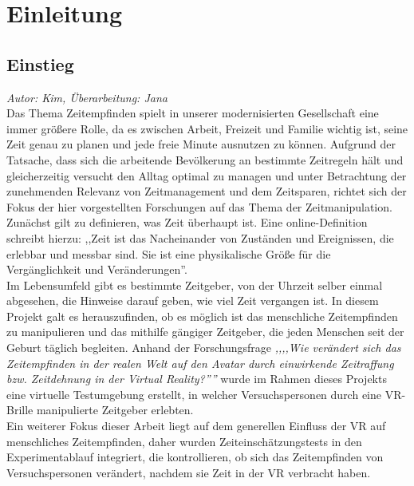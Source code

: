 \documentclass{Bericht}
\begin{document}
\maketitle


\tableofcontents
\clearpage

\section{Einleitung}
\subsection{Einstieg}
\textit{Autor: Kim, Überarbeitung: Jana}\\
	Das Thema Zeitempfinden spielt in unserer modernisierten Gesellschaft eine immer größere Rolle, da es zwischen Arbeit, Freizeit und Familie wichtig ist, seine Zeit genau zu planen und jede freie Minute ausnutzen zu können.	
	Aufgrund der Tatsache, dass sich die arbeitende Bevölkerung an bestimmte Zeitregeln hält und gleicherzeitig versucht den Alltag optimal zu managen und unter Betrachtung der zunehmenden Relevanz von Zeitmanagement und dem Zeitsparen, richtet sich der Fokus der hier vorgestellten Forschungen auf das Thema der Zeitmanipulation. Zunächst gilt zu definieren, was Zeit überhaupt ist. Eine online-Definition schreibt hierzu: ,,Zeit ist das Nacheinander von Zuständen und Ereignissen, die erlebbar und messbar sind. Sie ist eine physikalische Größe für die Vergänglichkeit und Veränderungen''.\cite{def}\\
	Im Lebensumfeld gibt es bestimmte Zeitgeber, von der Uhrzeit selber einmal abgesehen, die Hinweise darauf geben, wie viel Zeit vergangen ist. In diesem Projekt galt es herauszufinden, ob es möglich ist das menschliche Zeitempfinden zu manipulieren und das mithilfe gängiger Zeitgeber, die jeden Menschen seit der Geburt täglich begleiten. Anhand der Forschungsfrage \textit{,,,,Wie verändert sich das Zeitempfinden in der realen Welt auf den Avatar durch einwirkende Zeitraffung bzw. Zeitdehnung in der Virtual Reality?''''} wurde im Rahmen dieses Projekts eine virtuelle Testumgebung erstellt, in welcher Versuchspersonen durch eine VR-Brille manipulierte Zeitgeber erlebten.\\
Ein weiterer Fokus dieser Arbeit liegt auf dem generellen Einfluss der VR auf menschliches Zeitempfinden, daher wurden Zeiteinschätzungstests in den Experimentablauf integriert, die kontrollieren, ob sich das Zeitempfinden von Versuchspersonen verändert, nachdem sie Zeit in der VR verbracht haben.\\
\end{document}
